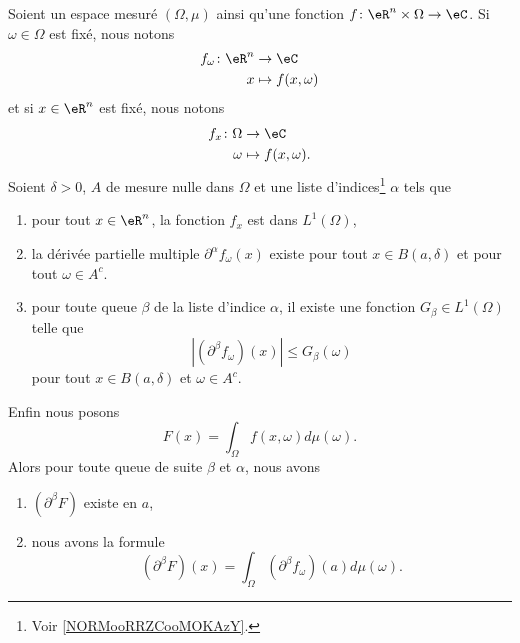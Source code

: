 \begin{proposition}     \label{PROPooJKXJooLxgEGd}
    Soient un espace mesuré \( (\Omega,\mu)\) ainsi qu'une fonction \( f\colon \eR^n\times \Omega\to \eC\). Si \( \omega\in \Omega\) est fixé, nous notons
    \begin{equation}
        \begin{aligned}
            f_{\omega}\colon \eR^n&\to \eC \\
            x&\mapsto f(x,\omega) 
        \end{aligned}
    \end{equation}
    et si \( x\in \eR^n\) est fixé, nous notons
    \begin{equation}
        \begin{aligned}
            f_x\colon \Omega&\to \eC \\
            \omega&\mapsto f(x,\omega). 
        \end{aligned}
    \end{equation}
    Soient \( \delta>0\), \( A\) de mesure nulle dans \( \Omega\) et une liste d'indices\footnote{Voir \ref{NORMooRRZCooMOKAzY}.} \( \alpha\) tels que
    \begin{enumerate}
        \item
            pour tout \( x\in \eR^n\), la fonction \( f_x\) est dans \( L^1(\Omega)\),
        \item
            la dérivée partielle multiple \( \partial^{\alpha}f_{\omega}(x)\) existe pour tout \( x\in B(a,\delta)\) et pour tout \( \omega\in A^c\).
        \item pour toute queue \( \beta\) de la liste d'indice \( \alpha\), il existe une fonction \( G_{\beta}\in L^1(\Omega)\) telle que
            \begin{equation}
                | (\partial^{\beta}f_{\omega})(x) |\leq G_{\beta}(\omega)
            \end{equation}
            pour tout \( x\in B(a,\delta)\) et \( \omega\in A^{c}\).
    \end{enumerate}
    Enfin nous posons
    \begin{equation}
        F(x)=\int_{\Omega}f(x,\omega)d\mu(\omega).
    \end{equation}
    Alors pour toute queue de suite \( \beta\) et \( \alpha\), nous avons
    \begin{enumerate}
        \item
            \( (\partial^{\beta}F)\) existe en \( a\),
        \item
            nous avons la formule
            \begin{equation}        \label{EQooTDDWooAcLRwX}
                (\partial^{\beta}F)(x)=\int_{\Omega}(\partial^{\beta}f_{\omega})(a)d\mu(\omega).
            \end{equation}
    \end{enumerate}
\end{proposition}

